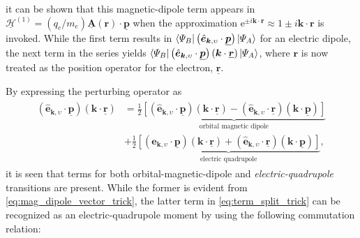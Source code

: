 it can be shown that this magnetic-dipole term appears in $\underline{\mathcal{H}}^{(1)} = (q_e / m_e) \underline{\mathbold{A}} ( \mathbold{r} ) \cdot \underline{\mathbold{p}}$ when the approximation $\mathrm{e}^{\pm i \mathbold{k} \cdot \mathbold{r}} \approx 1 \pm i \mathbold{k} \cdot \mathbold{r}$ is invoked. 
While the first term results in $\bra{\Psi_B} \left( \hat{\mathbold{e}}_{\mathbold{k},\upsilon} \cdot \underline{\mathbold{p}} \right) \ket{\Psi_A}$ for an electric dipole, the next term in the series yields $\bra{\Psi_B} \left( \hat{\mathbold{e}}_{\mathbold{k},\upsilon} \cdot \underline{\mathbold{p}} \right) \left( \mathbold{k} \cdot \underline{\mathbold{r}} \right) \ket{\Psi_A}$, where $\mathbold{r}$ is now treated as the position operator for the electron, $\underline{\mathbold{r}}$. 

By expressing the perturbing operator as 
\begin{align}\label{eq:term_split_trick}
 \begin{split}
 \left( \hat{\mathbold{e}}_{\mathbold{k},\upsilon} \cdot \underline{\mathbold{p}} \right) \left( \mathbold{k} \cdot \underline{\mathbold{r}} \right) &= \frac{1}{2} \underbrace{\left[ \left( \hat{\mathbold{e}}_{\mathbold{k},\upsilon} \cdot \underline{\mathbold{p}} \right) \left( \mathbold{k} \cdot \underline{\mathbold{r}} \right) - \left( \hat{\mathbold{e}}_{\mathbold{k},\upsilon} \cdot \underline{\mathbold{r}} \right) \left( \mathbold{k} \cdot \underline{\mathbold{p}} \right) \right]}_{\text{orbital magnetic dipole}}\\
 &+ \frac{1}{2} \underbrace{ \left[ \left( \hat{\mathbold{e}}_{\mathbold{k},\upsilon} \cdot \underline{\mathbold{p}} \right) \left( \mathbold{k} \cdot \underline{\mathbold{r}} \right) + \left( \hat{\mathbold{e}}_{\mathbold{k},\upsilon} \cdot \underline{\mathbold{r}} \right) \left( \mathbold{k} \cdot \underline{\mathbold{p}} \right) \right] }_{\text{electric quadrupole}},
 \end{split}
 \end{align}
it is seen that terms for both orbital-magnetic-dipole and \emph{electric-quadrupole} transitions are present. 
While the former is evident from \cref{eq:mag_dipole_vector_trick}, the latter term in \cref{eq:term_split_trick} can be recognized as an electric-quadrupole moment by using the following commutation relation:  
